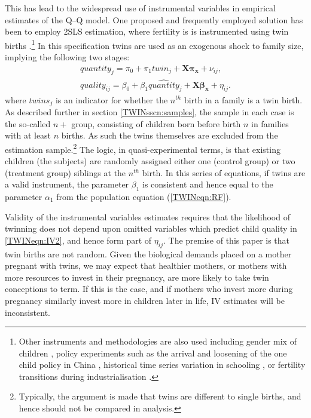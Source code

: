 \documentclass[subeqn]{article}
\begin{document}
\begin{spacing}{1.4}
This has lead to the widespread use of instrumental variables in empirical
estimates of the Q--Q model.  One proposed and frequently employed solution has
been to employ 2SLS estimation, where fertility is is instrumented using twin
births \citep{RosenzweigWolpin1980}.\footnote{Other instruments and methodologies
  are also used including gender mix of children \citep{ConleyGlauber2006}, policy
  experiments such as the arrival and loosening of the one child policy in China
  \citep{Qian2009,ArgysAverett2015}, historical time series variation in schooling
  \citep{BleakleyLange2009}, or fertility transitions during industrialisation
  \citep{DalgaardStrulik2015}.}  In this specification twins are used as an
exogenous shock to family size, implying the following two stages:
\begin{subequations}
  \begin{eqnarray}
    \label{TWINeqn:IV1}
    quantity_{j}=\pi_0+\pi_1 twin_{j} + \bm{X}\bm{\pi_x}+\nu_{ij}, \\ \label{TWINeqn:IV2}
    quality_{ij}=\beta_0 + \beta_1 \widehat{quantity}_j + \bm{X}\bm{\beta_x}+\eta_{ij}.
  \end{eqnarray}
\end{subequations}
where $twins_j$ is an indicator for whether the $n^{th}$ birth in a family is a
twin birth. As described further in section \ref{TWINsscn:samples}, the sample
in each case is the so-called $n+$ group, consisting of children born before
birth $n$ in families with at least $n$ births. As such the twins themselves are
excluded from the estimation sample.\footnote{Typically, the argument is made
  that twins are different to single births, and hence should not be compared in
  analysis.} The logic, in quasi-experimental terms, is that existing children
(the subjects) are randomly assigned either one (control group) or two
(treatment group) siblings at the $n^{th}$ birth.  In this series of equations,
if twins are a valid instrument, the parameter $\beta_1$ is consistent and hence
equal to the parameter $\alpha_1$ from the population equation
(\ref{TWINeqn:RF}).

Validity of the instrumental variables estimates requires that the likelihood
of twinning does not depend upon omitted variables which predict child quality
in \ref{TWINeqn:IV2}, and hence form part of $\eta_{ij}$.  The premise of this
paper is that twin births are not
random. Given the biological demands placed on a mother pregnant with twins,
we may expect that healthier mothers, or mothers with more resources to invest
in their pregnancy, are more likely to take twin conceptions to term.  If
this is the case, and if mothers who invest more during pregnancy similarly
invest more in children later in life, IV estimates will be inconsistent.


\end{spacing}
\end{document}
